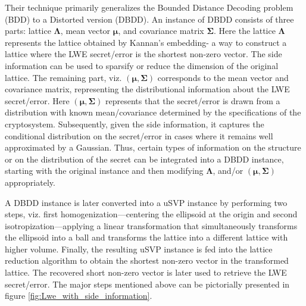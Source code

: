 Their technique primarily generalizes the Bounded Distance Decoding problem (BDD) to a Distorted version (DBDD). An instance of DBDD consists of three parts: lattice $\pmb{\Lambda}$, mean vector $\pmb{\mu}$, and covariance matrix $\pmb{\Sigma}$. Here the lattice $\pmb{\Lambda}$ represents the lattice obtained by Kannan's embedding- a way to construct a lattice where the LWE secret/error is the shortest non-zero vector. The side information can be used to sparsify or reduce the dimension of the original lattice. The remaining part, viz. $(\pmb{\mu,\Sigma})$ corresponds to the mean vector and covariance matrix, representing the distributional information about the LWE secret/error. Here $(\pmb{\mu,\Sigma})$ represents that the secret/error is drawn from a distribution with known mean/covariance determined by the specifications of the cryptosystem. Subsequently, given the side information, it captures the conditional distribution on the secret/error in cases where it remains well approximated by a Gaussian. Thus, certain types of information on the structure or on the distribution of the secret can be integrated into a DBDD instance, starting with the original instance and then modifying $\pmb{\Lambda}$, and/or $(\pmb{\mu, \Sigma})$ appropriately.

A DBDD instance is later converted into a uSVP instance by performing two steps, viz. first homogenization—centering the ellipsoid at the origin and second isotropization—applying a linear transformation that simultaneously transforms the ellipsoid into a ball and transforms the lattice into a different lattice with higher volume. Finally, the resulting uSVP instance is fed into the lattice reduction algorithm to obtain the shortest non-zero vector in the transformed lattice. The recovered short non-zero vector is later used to retrieve the LWE secret/error. The major steps mentioned above can be pictorially presented in figure \ref{fig:Lwe_with_side_information}.




